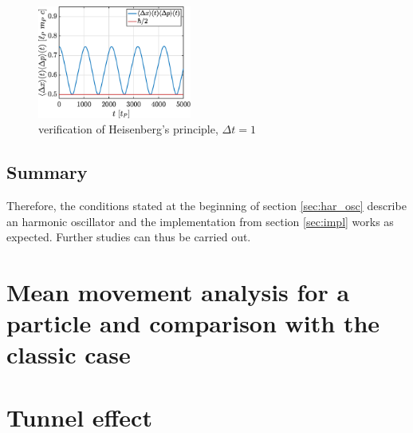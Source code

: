 \documentclass[a4paper,12pt,twoside]{article}
\begin{document}
    \begin{figure}[h]
      \centering
      \includegraphics[width=0.45\textwidth]{graphs/i_heisenberg.eps}
      \caption{verification of Heisenberg's principle, $\Delta t = 1$}
      \label{fig:i_heisenberg}
    \end{figure}

    \subsection{Summary}
    Therefore, the conditions stated at the beginning of section \ref{sec:har_osc} describe an harmonic oscillator and the implementation from section \ref{sec:impl} works as expected.
    Further studies can thus be carried out.


\newpage
\section{Mean movement analysis for a particle and comparison with the classic case}


\newpage
\section{Tunnel effect}
\end{document}
